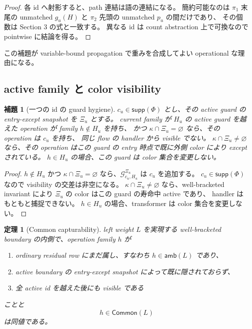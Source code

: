 \documentclass[uplatex,dvipdfmx,a4paper,10.5pt]{jsarticle}
\theoremstyle{jpplain}
\newtheorem{lemma}[definition]{補題}
\newtheorem{theorem}[definition]{定理}
\newcommand{\Common}{\mathsf{Common}}
\newcommand{\supp}{\mathsf{supp}}
\newcommand{\Guard}{\mathcal G}
\newcommand{\amb}{\mathsf{amb}}
\begin{document}
\begin{proof}
各 id へ射影すると、path 連結は語の連結になる。
簡約可能なのは $\pi_1$ 末尾の unmatched $g_u(H)$ と $\pi_2$ 先頭の unmatched $p_u$ の間だけであり、
その個数は Section 3 の式と一致する。
異なる id は count abstraction 上で可換なので pointwise に結論を得る。
\end{proof}

この補題が variable-bound propagation で重みを合成してよい operational な理由になる。

\subsection{active family と color visibility}

\begin{lemma}[一つの id の guard hygiene]\label{lem:one-color-hygiene}
$c_u\in\supp(\Phi)$ とし、その active guard の entry-except snapshot を $\Xi_u$ とする。
current family が $H_u$ の active guard を越えた operation が family $h\notin H_u$ を持ち、
かつ $\kappa\cap\Xi_u=\varnothing$ なら、その operation は $c_u$ を持ち、
同じ flow の handler から visible でない。
$\kappa\cap\Xi_u\neq\varnothing$ なら、その operation はこの guard の entry 時点で既に外側 color により except されている。
$h\in H_u$ の場合、この guard は color 集合を変更しない。
\end{lemma}

\begin{proof}
$h\notin H_u$ かつ $\kappa\cap\Xi_u=\varnothing$ なら、$\Guard_{c_u,H_u}^{\Xi_u}$ は $c_u$ を追加する。
$c_u\in\supp(\Phi)$ なので visibility の交差は非空になる。
$\kappa\cap\Xi_u\neq\varnothing$ なら、well-bracketed invariant により $\Xi_u$ の color はこの guard の寿命中 active であり、
handler はもともと捕捉できない。
$h\in H_u$ の場合、transformer は color 集合を変更しない。
\end{proof}

\begin{theorem}[Common capturability]\label{thm:common-visibility}
left weight $L$ を実現する well-bracketed boundary の内側で、operation family $h$ が
\begin{enumerate}
  \item ordinary residual row にまだ属し、すなわち $h\in\amb(L)$ であり、
  \item active boundary の entry-except snapshot によって既に隠されておらず、
  \item 全 active id を越えた後にも visible である
\end{enumerate}
ことと
\[
  h\in\Common(L)
\]
は同値である。
\end{theorem}
\end{document}
